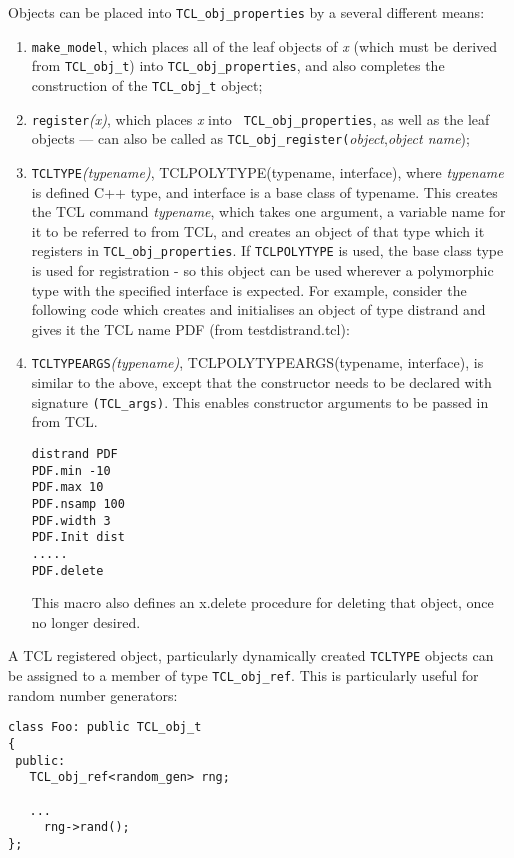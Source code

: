 Objects can be placed into {\tt TCL\_obj\_properties} by a several
different means:
\begin{enumerate}
\item {\tt make\_model}, which places all
  of the leaf objects of {\em x} (which must be derived from
  \verb+TCL_obj_t+) into {\tt TCL\_obj\_properties}, and also
  completes the construction of the \verb+TCL_obj_t+ object;
\item {\tt register}{\em (x)}, which places {\em x} into {\tt
    TCL\_obj\_properties}, as well as the leaf objects --- can also be
    called as \verb+TCL_obj_register(+{\em object},{\em object name});
\item {\tt TCLTYPE}{\em (typename)}\label{TCLTYPE},
TCLPOLYTYPE(typename, interface), where {\em
    typename} is defined C++ type, and interface is a base class of typename. This creates the TCL command {\em
    typename}, which takes one argument, a variable name for it to be
  referred to from TCL, and creates an object of that type which it
  registers in {\tt TCL\_obj\_properties}. If {\tt TCLPOLYTYPE} is
  used, the base class type is used for registration - so this object
  can be used wherever a polymorphic type with the specified interface
  is expected. For example, consider the
  following code which creates and initialises an object of type
  distrand and gives it the TCL name PDF (from
  testdistrand.tcl):
\item {\tt TCLTYPEARGS}{\em (typename)}\label{TCLTYPEARGS},
TCLPOLYTYPEARGS(typename, interface), is similar to the above, except
that the constructor needs to be declared with signature
\verb+(TCL_args)+. This enables constructor arguments to be
passed in from TCL.

\begin{verbatim}
distrand PDF
PDF.min -10
PDF.max 10
PDF.nsamp 100
PDF.width 3
PDF.Init dist
.....
PDF.delete
\end{verbatim}
  This macro also defines an x.delete procedure for
  deleting that object, once no longer desired.
\end{enumerate}

A TCL registered object, particularly dynamically created
\verb+TCLTYPE+ objects can be assigned to a member of type
\verb+TCL_obj_ref+. This is particularly useful
for random number generators:

\begin{verbatim}
class Foo: public TCL_obj_t
{
 public:
   TCL_obj_ref<random_gen> rng;

   ...
     rng->rand();
};
\end{verbatim}

